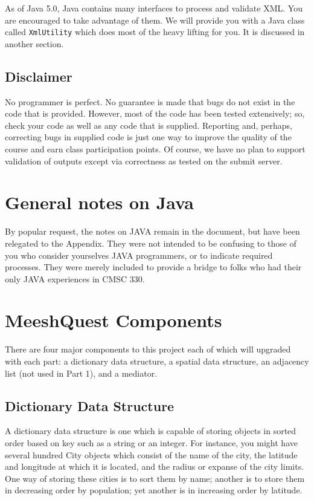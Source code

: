 \documentclass[12pt]{article}
\begin{document}
As of Java 5.0, Java contains many interfaces to process and validate XML. 
You are encouraged to take advantage of them. We will provide you with a 
Java class called \texttt{XmlUtility} which does most of the heavy lifting for you. 
It is discussed in another section.

\subsection{Disclaimer}

No programmer is perfect.  No guarantee is made that bugs do not exist
in the code that is provided.  However, most of the code has been
tested extensively; so, check your code as well as any code that is
supplied.  Reporting and, perhaps, correcting bugs in supplied code is
just one way to improve the quality of the course and earn class
participation points. Of course, we have no plan to support validation of outputs except via correctness
as tested on the submit server.

\section{General notes on Java}
By popular request, the notes on JAVA remain in the document, but have been relegated to the Appendix.
They were not intended to be confusing to those of you who consider
yourselves JAVA programmers, or to indicate  required processes. They
were merely included to provide a bridge to folks who had their only
JAVA experiences in CMSC 330.


\section{MeeshQuest Components}

There are four major components to this project each of which will upgraded
with each part: a dictionary data structure, a spatial data structure, an
adjacency list (not used in Part 1), and a mediator.
 
\subsection{Dictionary Data Structure} 


A dictionary data structure is one
which is capable of storing objects in sorted order based on key such as a
string or an integer. 
For instance, you might have several hundred City
objects which consist of the name of the city, the latitude and
longitude
at which it is located, and the radius or expanse of the city
limits. One way of storing these cities
is to sort them by name; another is to store them in  decreasing
order by
population; yet another
 is in  increasing order by latitude.
    
\end{document}
